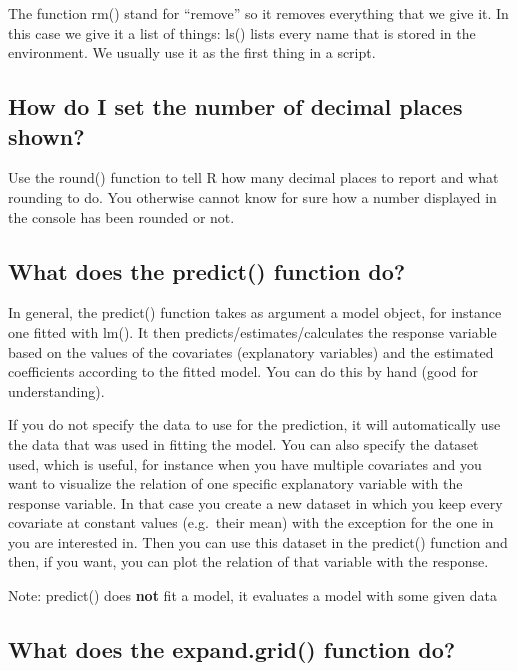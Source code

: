 \documentclass[
  letterpaper,
  8pt,
  a4paper]{book}
\begin{document}
The function rm() stand for ``remove'' so it removes everything that we
give it. In this case we give it a list of things: ls() lists every name
that is stored in the environment. We usually use it as the first thing
in a script.

\subsection*{How do I set the number of decimal places
shown?}\label{how-do-i-set-the-number-of-decimal-places-shown}

Use the round() function to tell R how many decimal places to report and
what rounding to do. You otherwise cannot know for sure how a number
displayed in the console has been rounded or not.

\subsection*{What does the predict() function
do?}\label{what-does-the-predict-function-do}

In general, the predict() function takes as argument a model object, for
instance one fitted with lm(). It then predicts/estimates/calculates the
response variable based on the values of the covariates (explanatory
variables) and the estimated coefficients according to the fitted model.
You can do this by hand (good for understanding).

If you do not specify the data to use for the prediction, it will
automatically use the data that was used in fitting the model. You can
also specify the dataset used, which is useful, for instance when you
have multiple covariates and you want to visualize the relation of one
specific explanatory variable with the response variable. In that case
you create a new dataset in which you keep every covariate at constant
values (e.g.~their mean) with the exception for the one in you are
interested in. Then you can use this dataset in the predict() function
and then, if you want, you can plot the relation of that variable with
the response.

Note: predict() does \textbf{not} fit a model, it evaluates a model with
some given data

\subsection*{What does the expand.grid() function
do?}\label{what-does-the-expand.grid-function-do}
\end{document}
